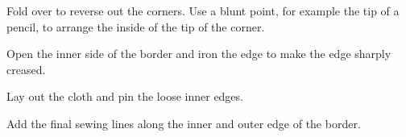 \clearpage

Fold over to reverse out the corners. Use a blunt point, for example the
tip of a pencil, to arrange the inside of the tip of the corner.


Open the inner side of the border and iron the edge to make the edge
sharply creased.


\clearpage

Lay out the cloth and pin the loose inner edges.


Add the final sewing lines along the inner and outer edge of the border.


